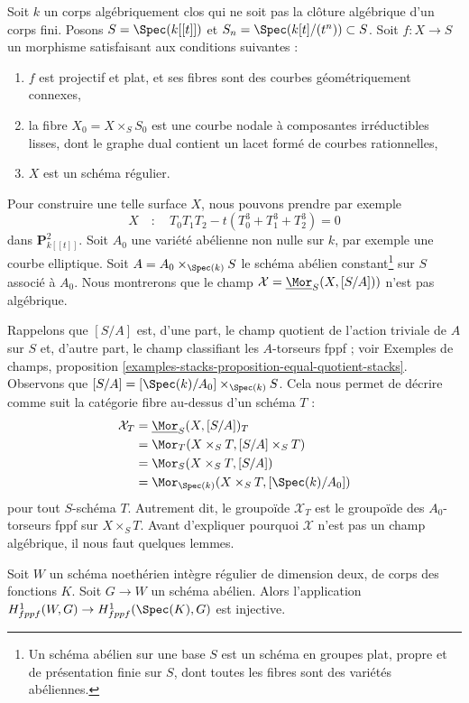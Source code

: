 \medskip\noindent
Soit $k$ un corps algébriquement clos qui ne soit pas la clôture
algébrique d'un corps fini. Posons $S = \Spec(k[[t]])$
et $S_n = \Spec(k[t]/(t^n)) \subset S$. Soit $f : X \to S$ un morphisme
satisfaisant aux conditions suivantes :
\begin{enumerate}
\item $f$ est projectif et plat, et ses fibres sont des courbes
géométriquement connexes,
\item la fibre $X_0 = X \times_S S_0$ est une courbe nodale à composantes
irréductibles lisses, dont le graphe dual contient un lacet formé de
courbes rationnelles,
\item $X$ est un schéma régulier.
\end{enumerate}
Pour construire une telle surface $X$, nous pouvons prendre par exemple
$$
X\quad :\quad T_0T_1T_2 - t(T_0^3 + T_1^3 + T_2^3) = 0
$$
dans $\mathbf{P}^2_{k[[t]]}$. Soit $A_0$ une variété abélienne non nulle sur $k$,
par exemple une courbe elliptique. Soit $A = A_0 \times_{\Spec(k)} S$ le
schéma abélien constant\footnote{Un schéma abélien sur une base $S$ est
un schéma en groupes plat, propre et de présentation finie sur $S$, dont
toutes les fibres sont des variétés abéliennes.}
sur $S$ associé à $A_0$. Nous montrerons que le
champ $\mathcal{X} = \underline{\Mor}_S(X, [S/A]))$ n'est pas algébrique.

\medskip\noindent
Rappelons que $[S/A]$ est, d'une part, le champ quotient de l'action
triviale de $A$ sur $S$ et,
d'autre part, le champ classifiant les $A$-torseurs fppf ; voir
Exemples de champs, proposition
\ref{examples-stacks-proposition-equal-quotient-stacks}.
Observons que $[S/A] = [\Spec(k)/A_0] \times_{\Spec(k)} S$. Cela nous
permet de décrire comme suit la catégorie fibre au-dessus d'un schéma $T$ :
\begin{align*}
\mathcal{X}_T
& =
\underline{\Mor}_S(X, [S/A])_T \\
& =
\Mor_T(X \times_S T, [S/A] \times_S T) \\
& =
\Mor_S(X \times_S T, [S/A]) \\
& =
\Mor_{\Spec(k)}(X \times_S T, [\Spec(k)/A_0])
\end{align*}
pour tout $S$-schéma $T$. Autrement dit, le groupoïde $\mathcal{X}_T$
est le groupoïde des $A_0$-torseurs fppf sur $X \times_S T$.
Avant d'expliquer pourquoi $\mathcal{X}$ n'est pas un champ algébrique,
il nous faut quelques lemmes.

\begin{lemma}
\label{lemma-torsors-over-two-dimensional-regular}
Soit $W$ un schéma noethérien intègre régulier de dimension deux,
de corps des fonctions $K$. Soit $G \to W$ un schéma abélien.
Alors l'application
$H^1_{fppf}(W, G) \to H^1_{fppf}(\Spec(K), G)$ est injective.
\end{lemma}

